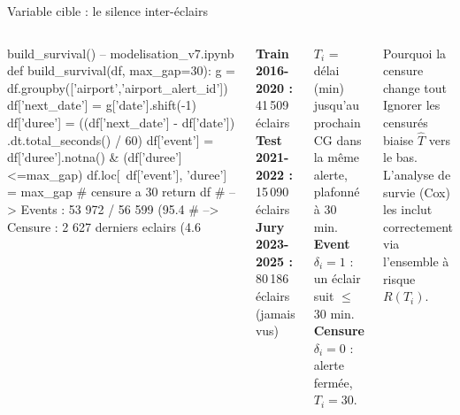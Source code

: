 \documentclass[aspectratio=169,t,11pt]{beamer}
\begin{document}
\begin{frame}[fragile,shrink=20]{Variable cible : le silence inter-éclairs}
\vspace{-2pt}
\begin{columns}[T]

\begin{codeslide}{build\_survival() -- modelisation\_v7.ipynb}
def build_survival(df, max_gap=30):
    g = df.groupby(['airport','airport_alert_id'])
    df['next_date'] = g['date'].shift(-1)
    df['duree'] = ((df['next_date'] - df['date'])
                   .dt.total_seconds() / 60)
    df['event'] = df['duree'].notna() & (df['duree']<=max_gap)
    df.loc[~df['event'], 'duree'] = max_gap  # censure a 30
    return df
# --> Events : 53 972 / 56 599  (95.4%
# --> Censure :  2 627 derniers eclairs (4.6%
\end{codeslide}
\vspace{3pt}
\begin{tcolorbox}[mybox,colback=metGreen!10,colframe=metGreen,
  title={Split temporel}]
\scriptsize
\textbf{Train 2016-2020 :} 41\,509 éclairs\\
\textbf{Test  2021-2022 :} 15\,090 éclairs\\
\textbf{Jury  2023-2025 :} 80\,186 éclairs (jamais vus)
\end{tcolorbox}

\begin{tcolorbox}[mybox,colback=metMid!10,colframe=metMid,
  title={Variable $T_i$ : silence inter-éclairs}]
\small
$T_i$ = délai (min) jusqu'au prochain CG dans la même alerte,
plafonné à 30 min.\\[4pt]
\textbf{Event} $\delta_i=1$ : un éclair suit $\le$ 30 min.\\
\textbf{Censure} $\delta_i=0$ : alerte fermée, $T_i=30$.
\end{tcolorbox}
\vspace{4pt}
\begin{exampleblock}{Pourquoi la censure change tout}
\small
Ignorer les censurés biaise $\hat{T}$ vers le bas.\\
L'analyse de survie (Cox) les inclut correctement
via l'ensemble à risque $R(T_i)$.
\end{exampleblock}
\end{columns}
\end{frame}
\end{document}

